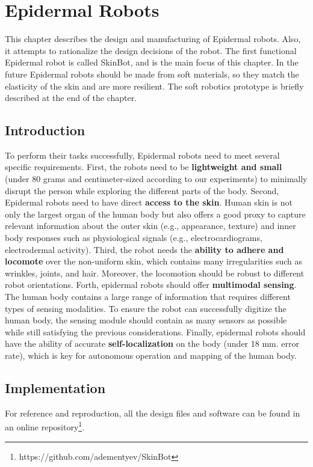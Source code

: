 

\chapter{Epidermal Robots}
This chapter describes the design and manufacturing of Epidermal robots.  Also, it attempts to rationalize the design decisions of the robot. The first functional Epidermal robot is called SkinBot, and is the main focus of this chapter. 
In the future Epidermal robots should be made from soft materials, so they match the elasticity of the skin and are more resilient. The soft robotics prototype is briefly described at the end of the chapter.

\section{Introduction}
To perform their tasks successfully, Epidermal robots need to meet several specific requirements. First, the robots need to be \textbf{lightweight and small} (under 80 grams and centimeter-sized according to our experiments) to minimally disrupt the person while exploring the different parts of the body. Second, Epidermal robots need to have direct \textbf{access to the skin}. Human skin is not only the largest organ of the human body but also offers a good proxy to capture relevant information about the outer skin (e.g., appearance, texture) and inner body responses such as physiological signals (e.g., electrocardiograms, electrodermal activity). Third, the robot needs the \textbf{ability to adhere and locomote} over the non-uniform skin, which contains many irregularities such as wrinkles, joints, and hair. Moreover, the locomotion should be robust to different robot orientations. Forth, epidermal robots should offer \textbf{multimodal sensing}. The human body contains a large range of information that requires different types of sensing modalities. To ensure the robot can successfully digitize the human body, the sensing module should contain as many sensors as possible while still satisfying the previous considerations. Finally, epidermal robots should have the ability of accurate \textbf{self-localization} on the body (under 18 mm. error rate), which is key for autonomous operation and mapping of the human body.
\section{Implementation}
For reference and reproduction, all the design files and software can be found in an online repository\footnote{https://github.com/adementyev/SkinBot}.

